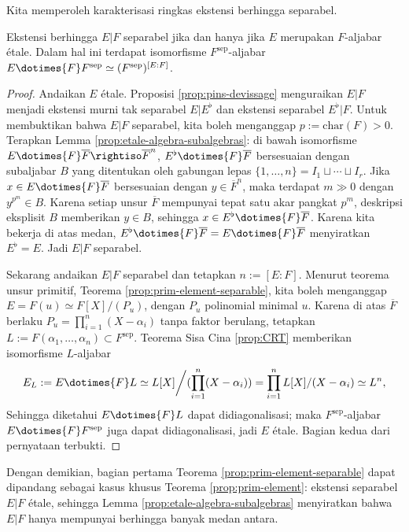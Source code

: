 Kita memperoleh karakterisasi ringkas ekstensi berhingga separabel.
\begin{proposition}\label{prop:etale-algebra-separable}
	Ekstensi berhingga $E|F$ separabel jika dan hanya jika $E$ merupakan $F$-aljabar étale. Dalam hal ini terdapat isomorfisme $F^\mathrm{sep}$-aljabar $E \dotimes{F} F^\mathrm{sep} \simeq (F^\mathrm{sep})^{[E:F]}$.
\end{proposition}
\begin{proof}
	Andaikan $E$ étale. Proposisi \ref{prop:pins-devissage} menguraikan $E|F$ menjadi ekstensi murni tak separabel $E|E^\flat$ dan ekstensi separabel $E^\flat|F$. Untuk membuktikan bahwa $E|F$ separabel, kita boleh menganggap $p := \text{char}(F) > 0$. Terapkan Lemma \ref{prop:etale-algebra-subalgebras}: di bawah isomorfisme $E \dotimes{F} \overline{F} \rightiso \overline{F}^n$, $E^\flat \dotimes{F} \overline{F}$ bersesuaian dengan subaljabar $B$ yang ditentukan oleh gabungan lepas $\{1, \ldots, n\} = I_1 \sqcup \cdots \sqcup I_r$. Jika $x \in E \dotimes{F} \overline{F}$ bersesuaian dengan $y \in \overline{F}^n$, maka terdapat $m \gg 0$ dengan $y^{p^m} \in B$. Karena setiap unsur $\overline{F}$ mempunyai tepat satu akar pangkat $p^m$, deskripsi eksplisit $B$ memberikan $y \in B$, sehingga $x \in E^\flat \dotimes{F} \overline{F}$. Karena kita bekerja di atas medan, $E^\flat \dotimes{F} \overline{F} = E \dotimes{F} \overline{F}$ menyiratkan $E^\flat = E$. Jadi $E|F$ separabel.
	
	Sekarang andaikan $E|F$ separabel dan tetapkan $n := [E:F]$. Menurut teorema unsur primitif, Teorema \ref{prop:prim-element-separable}, kita boleh menganggap $E = F(u) \simeq F[X]/(P_u)$, dengan $P_u$ polinomial minimal $u$. Karena di atas $\overline{F}$ berlaku $P_u = \prod_{i=1}^n (X-\alpha_i)$ tanpa faktor berulang, tetapkan $L := F(\alpha_1, \ldots, \alpha_n) \subset F^\text{sep}$. Teorema Sisa Cina \ref{prop:CRT} memberikan isomorfisme $L$-aljabar
	\[ E_L := E \dotimes{F} L \simeq L[X] \bigg/ ( \prod_{i=1}^n (X-\alpha_i) ) = \prod_{i=1}^n L[X]/(X-\alpha_i) \simeq L^n, \]
	Sehingga diketahui $E \dotimes{F} L$ dapat didiagonalisasi; maka $F^\mathrm{sep}$-aljabar $E \dotimes{F} F^\mathrm{sep}$ juga dapat didiagonalisasi, jadi $E$ étale. Bagian kedua dari pernyataan terbukti.
\end{proof}
\begin{remark}
	Dengan demikian, bagian pertama Teorema \ref{prop:prim-element-separable} dapat dipandang sebagai kasus khusus Teorema \ref{prop:prim-element}: ekstensi separabel $E|F$ étale, sehingga Lemma \ref{prop:etale-algebra-subalgebras} menyiratkan bahwa $E|F$ hanya mempunyai berhingga banyak medan antara.
\end{remark}

